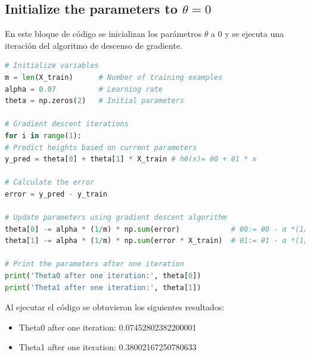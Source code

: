 \documentclass{article}
\begin{document}
    \subsection{Initialize the parameters to $\theta = 0$}\label{ssec:Initialize-Parameters}
    En este bloque de código se inicializan los parámetros $\theta$ a 0 y se ejecuta una iteración del algoritmo de descenso de gradiente.
    \begin {lstlisting}[language=Python, caption={Inicialización de los parámetros a $\theta = 0$},label={lst:InitializeParameters}]
# Initialize variables
m = len(X_train)      # Number of training examples
alpha = 0.07          # Learning rate
theta = np.zeros(2)   # Initial parameters

# Gradient descent iterations
for i in range(1):
# Predict heights based on current parameters
y_pred = theta[0] + theta[1] * X_train # hθ(x)= θ0 + θ1 * x

# Calculate the error
error = y_pred - y_train

# Update parameters using gradient descent algorithm
theta[0] -= alpha * (1/m) * np.sum(error)            # θ0:= θ0 - α *(1/m) ∑ [hθ(xi) - yi]
theta[1] -= alpha * (1/m) * np.sum(error * X_train)  # θ1:= θ1 - α *(1/m) ∑ [hθ(xi) - yi]*xi

# Print the parameters after one iteration
print('Theta0 after one iteration:', theta[0])
print('Theta1 after one iteration:', theta[1])

\end{lstlisting}
\noindent
Al ejecutar el código se obtuvieron los siguientes resultados:
\begin{itemize}
\item Theta0 after one iteration: 0.07452802382200001
\item Theta1 after one iteration: 0.38002167250780633
\end{itemize}

\end{document}
